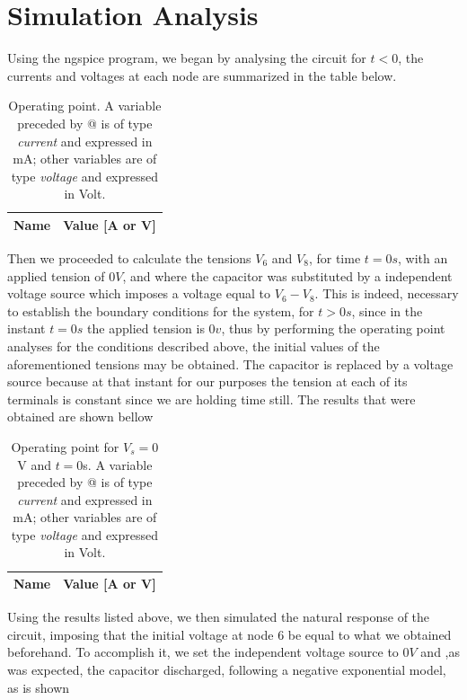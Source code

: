 \section{Simulation Analysis}

Using the ngspice program, we began by analysing the circuit for $t<0$, the currents and voltages at each node are summarized in the table below.

\begin{table}[h]
  \centering
  \begin{tabular}{|l|r|}
    \hline    
    {\bf Name} & {\bf Value [A or V]} \\ \hline
    
  \end{tabular}
  \caption{Operating point. A variable preceded by @ is of type {\em current}
    and expressed in mA; other variables are of type {\it voltage} and expressed in
    Volt.}
  \label{tab:op1}
\end{table}

Then we proceeded to calculate the tensions $V_6$ and $V_8$, for time $t=0s$, with an applied tension of $0V$, and where the capacitor was substituted by a independent voltage source which imposes a voltage equal to $V_6-V_8$. This is indeed, necessary to establish the boundary conditions for the system, for $t>0s$, since in the instant $t=0s$ the applied tension is $0v$, thus by performing the operating point analyses for the conditions described above, the initial values of the aforementioned tensions may be obtained. The capacitor is replaced by a voltage source because at that instant for our purposes the tension at each of its terminals is constant since we are holding time still.
The results that were obtained are shown bellow


\begin{table}[h]
  \centering
  \begin{tabular}{|l|r|}
    \hline    
    {\bf Name} & {\bf Value [A or V]} \\ \hline
    
  \end{tabular}
  \caption{Operating point for $V_s = 0$V and  $t = 0$s. A variable preceded by @ is of type {\em current}
    and expressed in mA; other variables are of type {\it voltage} and expressed in
    Volt.}
  \label{tab:op1}
\end{table}


Using the results listed above, we then simulated the natural response of the circuit, imposing that the initial voltage at node 6 be equal to what we obtained beforehand. To accomplish it, we set the independent voltage source to $0V$ and ,as was expected, the capacitor discharged, following a negative exponential model, as is shown 

